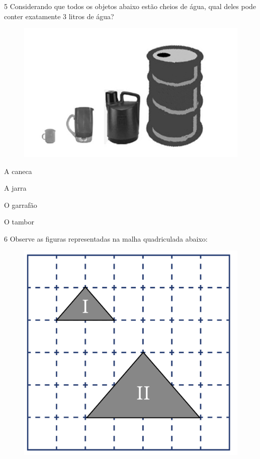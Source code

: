 \num{5} Considerando que todos os objetos abaixo estão cheios de água,
qual deles pode conter exatamente 3 litros de água?

\begin{figure}[htpb!]
\centering
\includegraphics[width=.5\textwidth]{./imgs/mat22.png}
\end{figure}


\begin{minipage}{.5\textwidth}
\begin{escolha}
\item
  A caneca
\item
  A jarra
\item
  O garrafão
\item
  O tambor
\end{escolha}
\end{minipage}

\pagebreak
\num{6} Observe as figuras representadas na malha quadriculada abaixo:

\begin{figure}[htpb!]
\centering
\includegraphics[width=.5\textwidth]{../ilustracoes/MAT5/SAEB_5ANO_MAT_figura125.png}
\end{figure}


